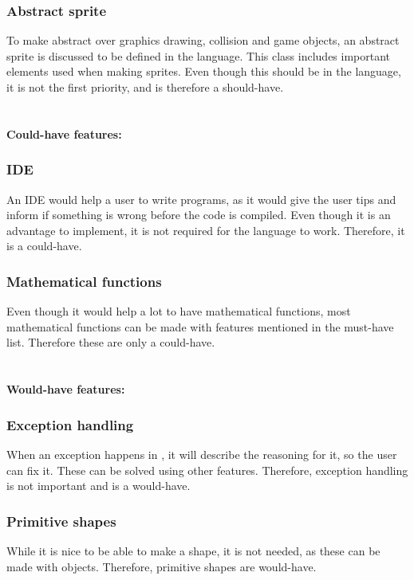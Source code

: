 \subsubsection*{Abstract sprite}
To make abstract over graphics drawing, collision and game objects, an abstract sprite is discussed to be defined in the language. This class includes important elements used when making sprites. Even though this should be in the language, it is not the first priority, and is therefore a should-have.
\\ \\ \\
\Large \textbf{Could-have features:} \normalsize \vspace{-7mm}
\subsubsection*{IDE}
An IDE would help a user to write programs, as it would give the user tips and inform if something is wrong before the code is compiled. Even though it is an advantage to implement, it is not required for the language to work. Therefore, it is a could-have.

\subsubsection*{Mathematical functions}
Even though it would help a lot to have mathematical functions, most mathematical functions can be made with features mentioned in the must-have list. Therefore these are only a could-have.
\\ \\ \\
\Large \textbf{Would-have features:} \normalsize \vspace{-7mm}

\subsubsection*{Exception handling}
When an exception happens in \lang{}, it will describe the reasoning for it, so the user can fix it. These can be solved using other features. Therefore, exception handling is not important and is a would-have.

\subsubsection*{Primitive shapes}
While it is nice to be able to make a shape, it is not needed, as these can be made with objects. Therefore, primitive shapes are would-have.

